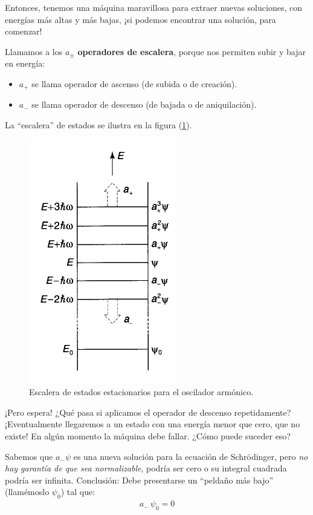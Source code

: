 \documentclass[12pt]{article}
\numberwithin{equation}{section}
\begin{document}
Entonces, tenemos una máquina maravillosa para extraer nuevas soluciones, con energías más altas y más bajas, ¡si podemos encontrar una solución, para comenzar!
\par
Llamamos a los $a_{\pm}$ \textbf{operadores de escalera}, porque nos permiten subir y bajar en energía:
\begin{itemize}
\item $a_{+}$ se llama operador de ascenso (de subida o de creación).
\item $a_{-}$ se llama operador de descenso (de bajada o de aniquilación).
\end{itemize}
La \enquote{escalera} de estados se ilustra en la figura (\ref{fig:figura_002}).
\begin{figure}[H]
    \centering
    \includegraphics[scale=0.7]{Imagenes/Operadores_escalera.png}
    \caption{Escalera de estados estacionarios para el oscilador armónico.}
    \label{fig:figura_002}
\end{figure}
¡Pero espera! ¿Qué pasa si aplicamos el operador de descenso repetidamente? ¡Eventualmente llegaremos a un estado con una energía menor que cero, que no existe! En algún momento la máquina debe fallar. ¿Cómo puede suceder eso? 
\par
Sabemos que $a_{-} \psi$ es una nueva solución para la ecuación de Schrödinger, pero \emph{no hay garantía de que sea normalizable}, podría ser cero o su integral cuadrada podría ser infinita. Conclusión: Debe presentarse un \enquote{peldaño más bajo} (llamémoslo $\psi_{0}$) tal que:
\begin{align}
a_{-} \, \psi_{0} = 0
\label{eq:ecuacion_02_058}
\end{align}
\end{document}

